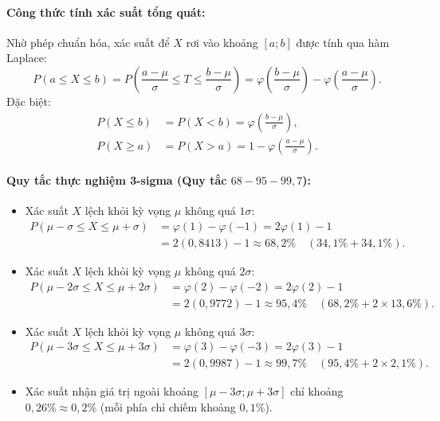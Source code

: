 \documentclass[12pt,a4paper]{article}
\theoremstyle{definition}
\begin{document}
\paragraph{Công thức tính xác suất tổng quát:}
Nhờ phép chuẩn hóa, xác suất để $X$ rơi vào khoảng $[a; b]$ được tính qua hàm Laplace:
\[
P(a \le X \le b) = P\left(\frac{a - \mu}{\sigma} \le T \le \frac{b - \mu}{\sigma}\right) = \varphi\left(\frac{b - \mu}{\sigma}\right) - \varphi\left(\frac{a - \mu}{\sigma}\right).
\]
Đặc biệt:
\begin{align*}
P(X \le b) &= P(X < b) = \varphi\left(\frac{b - \mu}{\sigma}\right), \\
P(X \ge a) &= P(X > a) = 1 - \varphi\left(\frac{a - \mu}{\sigma}\right).
\end{align*}

\paragraph{Quy tắc thực nghiệm 3-sigma (Quy tắc $68 - 95 - 99{,}7$):}
\begin{itemize}
    \item Xác suất $X$ lệch khỏi kỳ vọng $\mu$ không quá $1\sigma$:
    \begin{align*}
    P(\mu - \sigma \le X \le \mu + \sigma) &= \varphi(1) - \varphi(-1) = 2\varphi(1) - 1 \\
    &= 2(0{,}8413) - 1 \approx 68{,}2\% \quad (34{,}1\% + 34{,}1\%).
    \end{align*}
    \item Xác suất $X$ lệch khỏi kỳ vọng $\mu$ không quá $2\sigma$:
    \begin{align*}
    P(\mu - 2\sigma \le X \le \mu + 2\sigma) &= \varphi(2) - \varphi(-2) = 2\varphi(2) - 1 \\
    &= 2(0{,}9772) - 1 \approx 95{,}4\% \quad (68{,}2\% + 2 \times 13{,}6\%).
    \end{align*}
    \item Xác suất $X$ lệch khỏi kỳ vọng $\mu$ không quá $3\sigma$:
    \begin{align*}
    P(\mu - 3\sigma \le X \le \mu + 3\sigma) &= \varphi(3) - \varphi(-3) = 2\varphi(3) - 1 \\
    &= 2(0{,}9987) - 1 \approx 99{,}7\% \quad (95{,}4\% + 2 \times 2{,}1\%).
    \end{align*}
    \item Xác suất nhận giá trị ngoài khoảng $[\mu - 3\sigma; \mu + 3\sigma]$ chỉ khoảng $0{,}26\% \approx 0{,}2\%$ (mỗi phía chỉ chiếm khoảng $0{,}1\%$).
\end{itemize}
\end{document}
